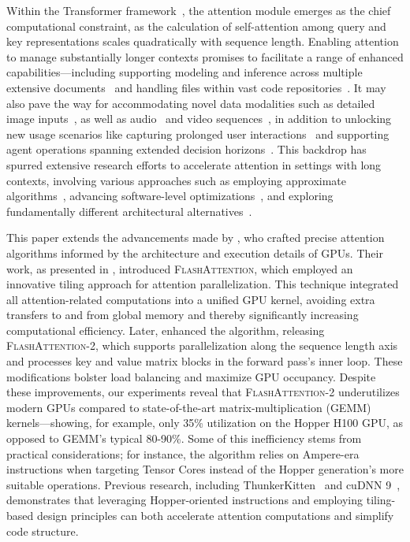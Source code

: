 Within the Transformer framework~\citep{vaswani2017attention}, the attention module emerges as the chief computational constraint, as the calculation of self-attention among query and key representations scales quadratically with sequence length. Enabling attention to manage substantially longer contexts promises to facilitate a range of enhanced capabilities—including supporting modeling and inference across multiple extensive documents~\citep{guo2021longt5,shaham2022scrolls,peng2023yarn} and handling files within vast code repositories~\citep{roziere2023code, li2023starcoder}. It may also pave the way for accommodating novel data modalities such as detailed image inputs~\citep{chen2022scaling}, as well as audio~\citep{gulati2020conformer} and video sequences~\citep{ho2022video}, in addition to unlocking new usage scenarios like capturing prolonged user interactions~\citep{sun2019bert4rec} and supporting agent operations spanning extended decision horizons~\citep{yao2022react}. This backdrop has spurred extensive research efforts to accelerate attention in settings with long contexts, involving various approaches such as employing approximate algorithms~\citep{katharopoulos2020transformers,choromanski2020rethinking, tay2020efficient}, advancing software-level optimizations~\citep{rabe2021self,dao2022flashattention,kwon2023efficient}, and exploring fundamentally different architectural alternatives~\citep{peng2023rwkv,sun2023retentive,gu2023mamba}.

This paper extends the advancements made by \citet{dao2022flashattention}, who crafted precise attention algorithms informed by the architecture and execution details of GPUs. Their work, as presented in \citep{dao2022flashattention}, introduced \textsc{FlashAttention}, which employed an innovative tiling approach for attention parallelization. This technique integrated all attention-related computations into a unified GPU kernel, avoiding extra transfers to and from global memory and thereby significantly increasing computational efficiency. Later, \citet{dao2023flashattention2} enhanced the algorithm, releasing \textsc{FlashAttention-2}, which supports parallelization along the sequence length axis and processes key and value matrix blocks in the forward pass's inner loop. These modifications bolster load balancing and maximize GPU occupancy. Despite these improvements, our experiments reveal that \textsc{FlashAttention-2} underutilizes modern GPUs compared to state-of-the-art matrix-multiplication (GEMM) kernels—showing, for example, only 35\% utilization on the Hopper H100 GPU, as opposed to GEMM's typical 80-90\%. Some of this inefficiency stems from practical considerations; for instance, the algorithm relies on Ampere-era instructions when targeting Tensor Cores instead of the Hopper generation's more suitable operations. Previous research, including ThunkerKitten~\citep{spector2024thunder} and cuDNN 9~\citep{cudnn9}, demonstrates that leveraging Hopper-oriented instructions and employing tiling-based design principles can both accelerate attention computations and simplify code structure.


